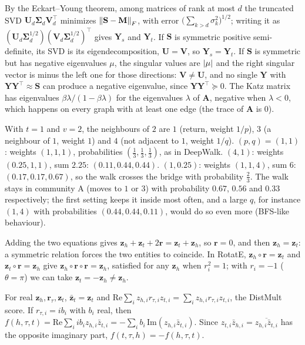 By the Eckart--Young theorem, among matrices of rank at most $d$ the truncated SVD $\mathbf U_d\boldsymbol\Sigma_d\mathbf V_d^\top$ minimizes $\left\|\mathbf S - \mathbf M\right\|_F$, with error $\bigl(\sum_{k>d}\sigma_k^2\bigr)^{1/2}$; writing it as $(\mathbf U_d\boldsymbol\Sigma_d^{1/2})(\mathbf V_d\boldsymbol\Sigma_d^{1/2})^\top$ gives $\mathbf Y_s$ and $\mathbf Y_t$. If $\mathbf S$ is symmetric positive semi-definite, its SVD is its eigendecomposition, $\mathbf U = \mathbf V$, so $\mathbf Y_s = \mathbf Y_t$. If $\mathbf S$ is symmetric but has negative eigenvalues $\mu$, the singular values are $\left|\mu\right|$ and the right singular vector is minus the left one for those directions: $\mathbf V \ne \mathbf U$, and no single $\mathbf Y$ with $\mathbf Y\mathbf Y^\top \approx \mathbf S$ can produce a negative eigenvalue, since $\mathbf Y\mathbf Y^\top \succeq 0$. The Katz matrix has eigenvalues $\beta\lambda/(1 - \beta\lambda)$ for the eigenvalues $\lambda$ of $\mathbf A$, negative when $\lambda < 0$, which happens on every graph with at least one edge (the trace of $\mathbf A$ is $0$).

With $t = 1$ and $v = 2$, the neighbours of $2$ are $1$ (return, weight $1/p$), $3$ (a neighbour of $1$, weight $1$) and $4$ (not adjacent to $1$, weight $1/q$).
$(p,q) = (1,1)$: weights $(1,1,1)$, probabilities $(\frac13, \frac13, \frac13)$, as in DeepWalk.
$(4,1)$: weights $(0.25, 1, 1)$, sum $2.25$: $(0.11, 0.44, 0.44)$.
$(1, 0.25)$: weights $(1, 1, 4)$, sum $6$: $(0.17, 0.17, 0.67)$, so the walk crosses the bridge with probability $\frac23$.
The walk stays in community A (moves to $1$ or $3$) with probability $0.67$, $0.56$ and $0.33$ respectively; the first setting keeps it inside most often, and a large $q$, for instance $(1,4)$ with probabilities $(0.44, 0.44, 0.11)$, would do so even more (BFS-like behaviour).

Adding the two equations gives $\mathbf z_h + \mathbf z_t + 2\mathbf r = \mathbf z_t + \mathbf z_h$, so $\mathbf r = 0$, and then $\mathbf z_h = \mathbf z_t$: a symmetric relation forces the two entities to coincide. In RotatE, $\mathbf z_h\circ\mathbf r = \mathbf z_t$ and $\mathbf z_t\circ\mathbf r = \mathbf z_h$ give $\mathbf z_h\circ\mathbf r\circ\mathbf r = \mathbf z_h$, satisfied for any $\mathbf z_h$ when $r_i^2 = 1$; with $r_i = -1$ ($\theta = \pi$) we can take $\mathbf z_t = -\mathbf z_h \ne \mathbf z_h$.

For real $\mathbf z_h, \mathbf r_\tau, \mathbf z_t$, $\bar{\mathbf z}_t = \mathbf z_t$ and $\mathrm{Re}\sum_i z_{h,i}r_{\tau,i}z_{t,i} = \sum_iz_{h,i}r_{\tau,i}z_{t,i}$, the DistMult score. If $r_{\tau,i} = ib_i$ with $b_i$ real, then $f(h,\tau,t) = \mathrm{Re}\sum_iib_iz_{h,i}\bar z_{t,i} = -\sum_ib_i\,\mathrm{Im}(z_{h,i}\bar z_{t,i})$. Since $z_{t,i}\bar z_{h,i} = \overline{z_{h,i}\bar z_{t,i}}$ has the opposite imaginary part, $f(t,\tau,h) = -f(h,\tau,t)$.

